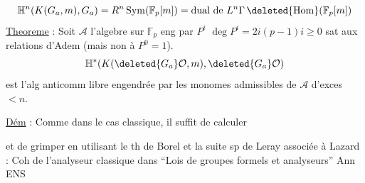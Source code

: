 \[
\mathbb H^n(K(G_a,m),G_a)=R^n\operatorname{Sym}(\mathbb F_p[m])
=\text{dual de }L^n\Gamma\,\deleted{\mathrm{Hom}}(\mathbb F_p[m])
\]
\uline{Theoreme} : Soit $\mathscr A$ l'algebre sur $\mathbb F_p$ eng par $P^i$\qquad
$\deg P^i=2i(p-1)$\qquad $i\geq0$ sat aux relations d'Adem (mais non à $P^0=1$).
\[
\mathbb H^*(K(\deleted{G_a}\mathcal O,m),\deleted{G_a}\mathcal O)
\]
est l'alg anticomm libre engendrée par les monomes admissibles de $\mathscr A$ d'exces $<n$.

\uline{Dém} : Comme dans le cas classique, il suffit de calculer  et de grimper en utilisant le th de Borel et la suite sp de Leray associée à
 Lazard : Coh de l'analyseur classique dans ``Lois de groupes formels et analyseurs'' Ann ENS

